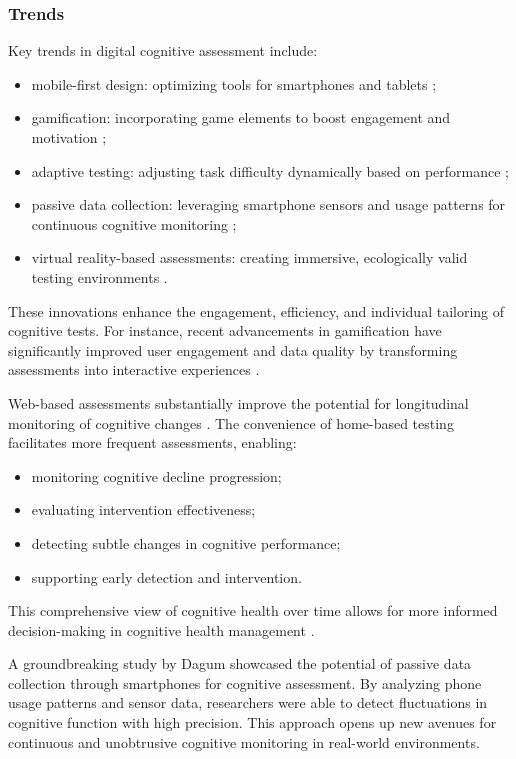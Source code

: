 \subsubsection{Trends}
Key trends in digital cognitive assessment include:
\begin{itemize}
\item mobile-first design: optimizing tools for smartphones and tablets \cite{Zygouris2017};
\item gamification: incorporating game elements to boost engagement and motivation \cite{Lumsden2016};
\item adaptive testing: adjusting task difficulty dynamically based on performance \cite{Finkelman2016};
\item passive data collection: leveraging smartphone sensors and usage patterns for continuous cognitive monitoring \cite{Dagum2018};
\item virtual reality-based assessments: creating immersive, ecologically valid testing environments \cite{Parsons2018}.
\end{itemize}

These innovations enhance the engagement, efficiency, and individual tailoring of cognitive tests. For instance, recent advancements in gamification have significantly improved user engagement and data quality by transforming assessments into interactive experiences \cite{Bowers2021}.

Web-based assessments substantially improve the potential for longitudinal monitoring of cognitive changes \cite{Wild2021}. The convenience of home-based testing facilitates more frequent assessments, enabling:
\begin{itemize}
\item monitoring cognitive decline progression;
\item evaluating intervention effectiveness;
\item detecting subtle changes in cognitive performance;
\item supporting early detection and intervention.
\end{itemize}

This comprehensive view of cognitive health over time allows for more informed decision-making in cognitive health management \cite{Zygouris2017}.

A groundbreaking study by Dagum \cite{Dagum2018} showcased the potential of passive data collection through smartphones for cognitive assessment. By analyzing phone usage patterns and sensor data, researchers were able to detect fluctuations in cognitive function with high precision. This approach opens up new avenues for continuous and unobtrusive cognitive monitoring in real-world environments.

